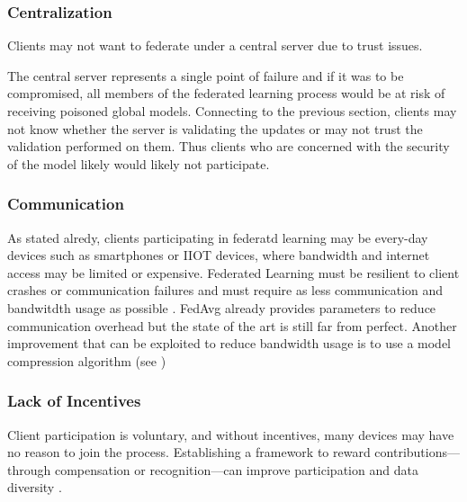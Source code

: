 \subsubsection{Centralization} \label{sec:fl-centralization}
Clients may not want to federate under a central server due to trust issues.

The central server represents a single point of failure and if it was to be compromised,
all members of the federated learning process would be at risk of receiving poisoned global models.
Connecting to the previous section, clients may not know whether the server is validating the
updates or may not trust the validation performed on them.
Thus clients who are concerned with the security of the model likely would likely not participate.

\subsubsection{Communication}
As stated alredy, clients participating in federatd learning may be every-day devices such as smartphones or
IIOT devices, where bandwidth and internet access may be limited or expensive.
Federated Learning must be resilient to client crashes or communication failures and must require as less communication
and bandwitdth usage as possible \cite{Li2020}.
FedAvg already provides parameters to reduce communication overhead but the state of the art is still far from perfect.
Another improvement that can be exploited to reduce bandwidth usage is to use a model compression algorithm
(see \cite{ATOMO})

\subsubsection{Lack of Incentives}
Client participation is voluntary, and without incentives, many devices may have no reason to join the process.
Establishing a framework to reward contributions—through compensation or recognition—can improve
participation and data diversity \cite{Li2020}.

